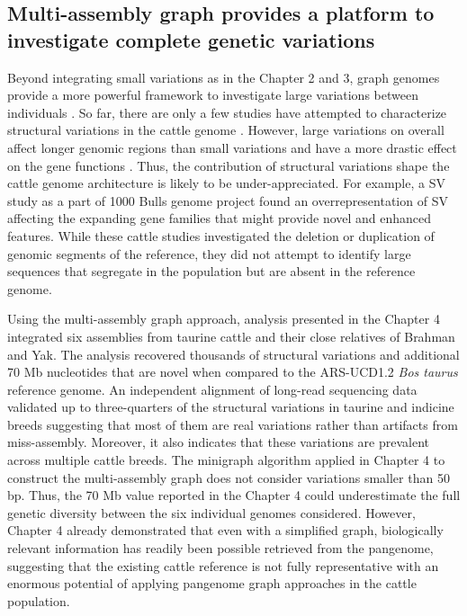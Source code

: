 \documentclass[../main.tex]{subfiles}
\begin{document}
\subsection*{Multi-assembly graph provides a platform to investigate complete genetic variations }

Beyond integrating small variations as in the Chapter 2 and 3, graph genomes provide a more powerful framework to investigate large variations between individuals \citep{eggertsson2019graphtyper2,chen2019paragraph,siren2020genotyping}. So far, there are only a few studies have attempted to characterize structural variations in the cattle genome \citep{liu2010analysis,bickhart2012copy,boussaha2015genome,chen2017detection,Hu2020}. However, large variations on overall affect longer genomic regions than small variations and have a more drastic effect on the gene functions \citep{chiang2017impact,scott2021structural}. Thus, the contribution of structural variations shape the cattle genome architecture is likely to be under-appreciated. For example, a SV study as a part of  1000 Bulls genome project \citep{chen2017detection} found an overrepresentation of SV affecting the expanding gene families that might provide novel and enhanced features. While these cattle studies investigated the deletion or duplication of  genomic segments of the reference, they did not attempt to identify large sequences that segregate in the population but are absent in the reference genome. 

Using the multi-assembly graph approach, analysis presented in the Chapter 4 integrated six assemblies from taurine cattle and their close relatives of Brahman and Yak. The analysis recovered thousands of structural variations and additional 70 Mb nucleotides that are novel when compared to the ARS-UCD1.2 \emph{Bos taurus} reference genome. An independent alignment of long-read sequencing data validated up to three-quarters of the structural variations in taurine and indicine breeds suggesting that most of them are real variations rather than artifacts from miss-assembly. Moreover, it also indicates that these variations are prevalent across multiple cattle breeds. The minigraph algorithm applied in Chapter 4 to construct the multi-assembly graph does not consider variations smaller than 50 bp. Thus, the 70 Mb value reported in the Chapter 4 could underestimate the full genetic diversity between the six individual genomes considered. However, Chapter 4 already demonstrated that even with a simplified graph, biologically relevant information has readily been possible retrieved from the pangenome, suggesting that the existing cattle reference is not fully representative with an enormous potential of applying pangenome graph approaches in the cattle population. 
\end{document}
